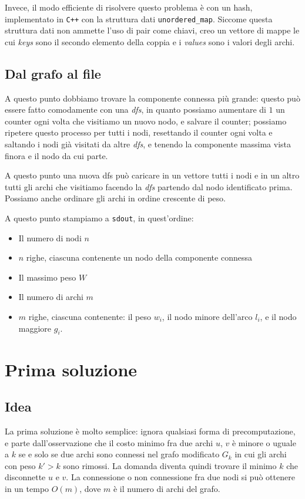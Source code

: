 \documentclass[a4paper]{article}
\begin{document}
Invece, il modo efficiente di risolvere questo problema è con un hash, implementato in \texttt{C++} con la struttura dati \texttt{unordered\_map}. Siccome questa struttura dati non ammette l'uso di pair come chiavi, creo un vettore di mappe le cui \textit{keys} sono il secondo elemento della coppia e i \textit{values} sono i valori degli archi.

\subsection{Dal grafo al file}
A questo punto dobbiamo trovare la componente connessa più grande: questo può essere fatto comodamente con una \textit{dfs}, in quanto possiamo aumentare di $1$ un counter ogni volta che visitiamo un nuovo nodo, e salvare il counter; possiamo ripetere questo processo per tutti i nodi, resettando il counter ogni volta e saltando i nodi già visitati da altre \textit{dfs}, e tenendo la componente massima vista finora e il nodo da cui parte.

A questo punto una nuova dfs può caricare in un vettore tutti i nodi e in un altro tutti gli archi che visitiamo facendo la \textit{dfs} partendo dal nodo identificato prima. Possiamo anche ordinare gli archi in ordine crescente di peso.

A questo punto stampiamo a \texttt{sdout}, in quest'ordine:
\begin{itemize}
    \item Il numero di nodi $n$
    \item $n$ righe, ciascuna contenente un nodo della componente connessa
    \item Il massimo peso $W$
    \item Il numero di archi $m$
    \item $m$ righe, ciascuna contenente: il peso $w_i$, il nodo minore dell'arco $l_i$, e il nodo maggiore $g_i$.
\end{itemize}

\section{Prima soluzione}
\subsection{Idea}
La prima soluzione è molto semplice: ignora qualsiasi forma di precomputazione, e parte dall'osservazione che il costo minimo fra due archi $u$, $v$ è minore o uguale a $k$ se e solo se due archi sono connessi nel grafo modificato $G_k$ in cui gli archi con peso $k'>k$ sono rimossi. La domanda diventa quindi trovare il minimo $k$ che disconnette $u$ e $v$. La connessione o non connessione fra due nodi si può ottenere in un tempo $O(m)$, dove $m$ è il numero di archi del grafo.
\end{document}

